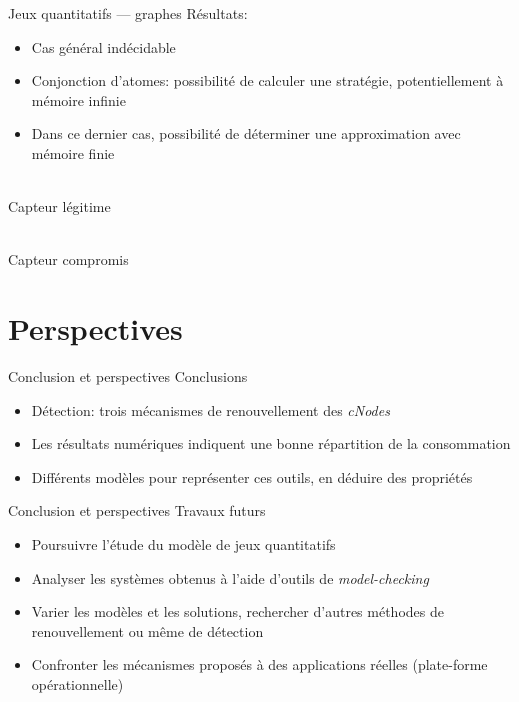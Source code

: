 \documentclass[aspectratio=43]{beamer} %
\newcommand\cns{\textit{cNodes}\xspace}
\begin{document}
\begin{frame}{Jeux quantitatifs --- graphes}
  \small
  Résultats:
  \begin{itemize}
    \item \alert{Cas général} indécidable
    \item \alert{Conjonction d'atomes}: possibilité de calculer une stratégie, potentiellement à mémoire infinie
    \item Dans ce dernier cas, possibilité de déterminer une \alert{approximation} avec mémoire finie
  \end{itemize}
  \vfill
  \begin{minipage}{0.48\textwidth}
    \centering
    \\
    {\scriptsize Capteur légitime}
  \end{minipage}\hfill
  \begin{minipage}{0.48\textwidth}
    \centering
    \\
    {\scriptsize Capteur compromis}
  \end{minipage}
\end{frame}
\section{Perspectives}
\begin{frame}{Conclusion et perspectives}
  Conclusions
  \begin{itemize}
    \item Détection: trois mécanismes de renouvellement des \cns
    \item Les résultats numériques indiquent une bonne répartition de la consommation
    \item Différents modèles pour représenter ces outils, en déduire des propriétés
  \end{itemize}
\end{frame}

\begin{frame}{Conclusion et perspectives}
  Travaux futurs
  \begin{itemize}
    \item Poursuivre l'étude du modèle de jeux quantitatifs
    \item Analyser les systèmes obtenus à l'aide d'outils de \textit{model-checking}
    \item Varier les modèles et les solutions, rechercher d'autres méthodes de renouvellement ou même de détection
    \item Confronter les mécanismes proposés à des applications réelles (plate-forme opérationnelle)
  \end{itemize}
  \vfill

\end{frame}
\end{document}
